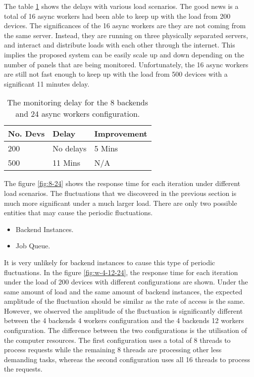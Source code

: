 \documentclass[../thesis.tex]{subfiles}
\begin{document}
The table \ref{tab:delay8-24} shows the delays with various load scenarios. The good news is a total of 16 async workers had been able to keep up with the load from 200 devices. The significances of the 16 async workers are they are not coming from the same server. Instead, they are running on three physically separated servers, and interact and distribute loads with each other through the internet. This implies the proposed system can be easily scale up and down depending on the number of panels that are being monitored. Unfortunately, the 16 async workers are still not fast enough to keep up with the load from 500 devices with a significant 11 minutes delay. 

\begin{table}[h!]
	\begin{center}
		\caption{The monitoring delay for the 8 backends and 24 async workers configuration.}
		\label{tab:delay8-24}
		\begin{tabular}{l|l|l}
			\toprule
			\textbf{No. Devs} & \textbf{Delay} & \textbf{Improvement}\\
			\midrule
			200 & No delays & 5 Mins	\\
			500 & 11 Mins & N/A\\
			\bottomrule
		\end{tabular}
	\end{center}
\end{table}

The figure \ref{fig:8-24} shows the response time for each iteration under different load scenarios. The fluctuations that we discovered in the previous section is much more significant under a much larger load. There are only two possible entities that may cause the periodic fluctuations.

\begin{itemize}
	\item Backend Instances.
	\item Job Queue.
\end{itemize}

It is very unlikely for backend instances to cause this type of periodic fluctuations. In the figure \ref{fig:w-4-12-24}, the response time for each iteration under the load of 200 devices with different configurations are shown. Under the same amount of load and the same amount of backend instances,  the expected amplitude of the fluctuation should be similar as the rate of access is the same. However, we observed the amplitude of the fluctuation is significantly different between the 4 backends 4 workers configuration and the 4 backends 12 workers configuration. The difference between the two configurations is the utilisation of the computer resources. The first configuration uses a total of 8 threads to process requests while the remaining 8 threads are processing other less demanding tasks, whereas the second configuration uses all 16 threads to process the requests. 
\end{document}
